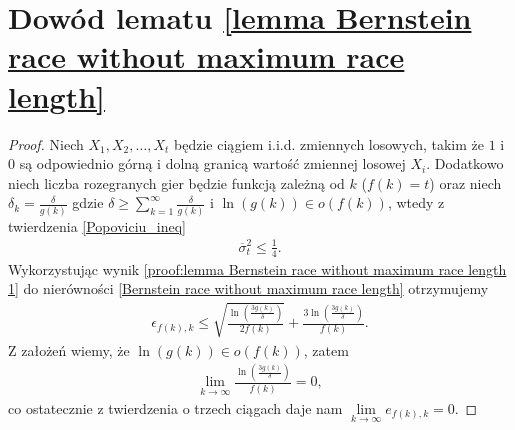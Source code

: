 \documentclass[inzynierska]{pwr_wmat_praca_dyplomowa}
\theoremstyle{plain}
\numberwithin{theorem}{chapter}
\theoremstyle{definition}
\numberwithin{theorem}{chapter}
\begin{document}
\section{Dowód lematu \ref{lemma Bernstein race without maximum race length}}\label{proof:lemma Bernstein race without maximum race length}
\begin{proof}
	Niech $X_1, X_2, \dots, X_t$ będzie ciągiem i.i.d. zmiennych losowych, takim że $1$ i $0$ są odpowiednio górną i dolną granicą wartość zmiennej losowej $X_i$. Dodatkowo niech liczba rozegranych gier będzie funkcją zależną od $k$ ($f(k) = t$) %
	oraz niech $\delta_k = \frac{\delta}{g(k)}$
	gdzie $\delta \ge \sum_{k=1}^{\infty} \frac{\delta}{g(k)}$ i $\ln(g(k)) \in o(f(k))$, wtedy z twierdzenia \ref{Popoviciu_ineq}
	\begin{gather}
		\label{proof:lemma Bernstein race without maximum race length 1}
		 \overline{\sigma}_t^2 \le \frac{1}{4}.
	\end{gather}
	Wykorzystując wynik \eqref{proof:lemma Bernstein race without maximum race length 1} do nierówności \eqref{Bernstein race without maximum race length} otrzymujemy 
	\begin{gather*}
		\epsilon_{f(k), k} \le  \sqrt{\frac{\ln(\frac{3g(k)}{\delta})}{2f(k)}} + \frac{3  \ln{(\frac{3g(k)}{\delta})}}{f(k)}.
	\end{gather*}
	Z założeń wiemy, że $\ln(g(k)) \in o(f(k))$, zatem
	\begin{gather*}
		\lim\limits_{k\to\infty} \frac{  \ln{(\frac{3g(k)}{\delta})}}{f(k)} = 0,
	\end{gather*}
	co ostatecznie z twierdzenia o trzech ciągach daje nam $ \lim\limits_{k\to\infty}  e_{f(k), k} = 0$.
\end{proof}
\end{document}
